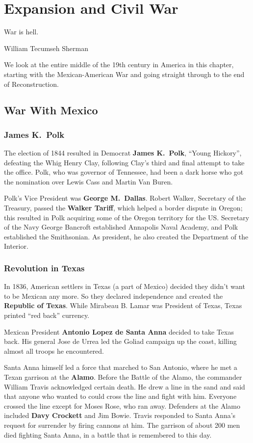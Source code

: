 \chapter{Expansion and Civil War}

\epigraph{%
  War is hell.
}{William Tecumseh Sherman}

We look at the entire middle of the 19th century in America in this chapter,
starting with the Mexican-American War and going straight through to the end of Reconstruction.

\section{War With Mexico}

\subsection*{James K.\ Polk}

The election of 1844 resulted in Democrat \textbf{James K.\ Polk}, ``Young Hickory'', defeating the Whig Henry Clay,
following Clay's third and final attempt to take the office.
Polk, who was governor of Tennessee, had been a dark horse who got the nomination over Lewis Cass and Martin Van Buren.

Polk's Vice President was \textbf{George M.\ Dallas}.
Robert Walker, Secretary of the Treasury, passed the \textbf{Walker Tariff},
which helped a border dispute in Oregon;
this resulted in Polk acquiring some of the Oregon territory for the US\@.
Secretary of the Navy George Bancroft established Annapolis Naval Academy,
and Polk established the Smithsonian.
As president, he also created the Department of the Interior.

\subsection*{Revolution in Texas}

In 1836, American settlers in Texas (a part of Mexico) decided they didn't want to be Mexican any more.
So they declared independence and created the \textbf{Republic of Texas}.
While Mirabeau B. Lamar was President of Texas, Texas printed ``red back'' currency.

Mexican President \textbf{Antonio Lopez de Santa Anna} decided to take Texas back.
His general Jose de Urrea led the Goliad campaign up the coast, killing almost all troops he encountered.

Santa Anna himself led a force that marched to San Antonio, where he met a Texan garrison at the \textbf{Alamo}.
Before the Battle of the Alamo, the commander William Travis acknowledged certain death.
He drew a line in the sand and said that anyone who wanted to could cross the line and fight with him.
Everyone crossed the line except for Moses Rose, who ran away.
Defenders at the Alamo included \textbf{Davy Crockett} and Jim Bowie.
Travis responded to Santa Anna's request for surrender by firing cannons at him.
The garrison of about 200 men died fighting Santa Anna, in a battle that is remembered to this day.

